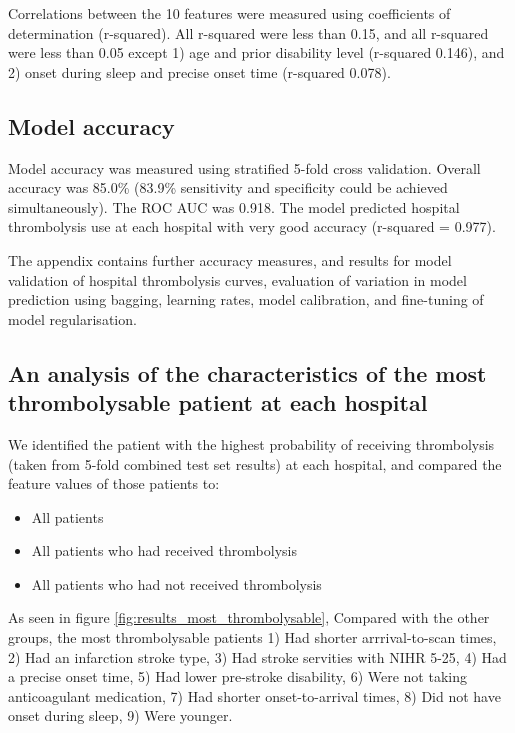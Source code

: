 Correlations between the 10 features were measured using coefficients of determination (r-squared). All r-squared were less than 0.15, and all r-squared were less than 0.05 except 1) age and prior disability level (r-squared 0.146), and 2) onset during sleep and precise onset time (r-squared 0.078).


\subsection{Model accuracy}

Model accuracy was measured using stratified 5-fold cross validation. Overall accuracy was 85.0\% (83.9\% sensitivity and specificity could be achieved simultaneously). The ROC AUC was 0.918. The model predicted hospital thrombolysis use at each hospital with very good accuracy (r-squared = 0.977).

The appendix contains further accuracy measures, and results for model validation of hospital thrombolysis curves, evaluation of variation in model prediction using bagging, learning rates, model calibration, and fine-tuning of model regularisation.


\subsection{An analysis of the characteristics of the most thrombolysable patient at each hospital}

We identified the patient with the highest probability of receiving thrombolysis (taken from 5-fold combined test set results) at each hospital, and compared the feature values of those patients to:

\begin{itemize}
    \item All patients
    \item All patients who had received thrombolysis
    \item All patients who had not received thrombolysis
\end{itemize}

As seen in figure \ref{fig:results_most_thrombolysable}, Compared with the other groups, the most thrombolysable patients 1) Had shorter arrrival-to-scan times, 2) Had an infarction stroke type, 3) Had stroke servities with NIHR 5-25, 4) Had a precise onset time, 5) Had lower pre-stroke disability, 6) Were not taking anticoagulant medication, 7) Had shorter onset-to-arrival times, 8) Did not have onset during sleep, 9) Were younger.

